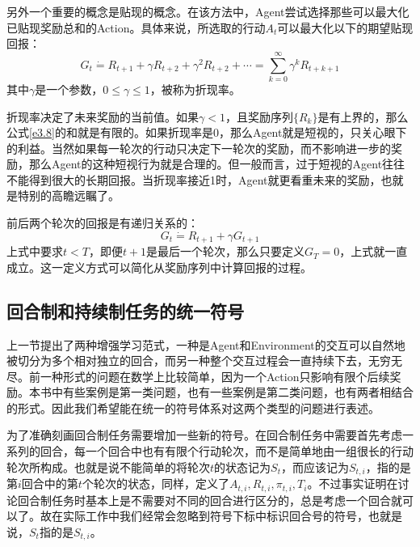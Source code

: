\documentclass{ctexart}
\begin{document}
            另外一个重要的概念是贴现的概念。在该方法中，Agent尝试选择那些可以最大化已贴现奖励总和的Action。具体来说，所选取的行动$A_t$可以最大化以下的期望贴现回报：
            \begin{equation}
                G_t \dot{=} R_{t+1} + \gamma R_{t+2} + \gamma^2 R_{t+2} + \cdots = \sum_{k=0}^{\infty} \gamma^k R_{t+k+1}
                \label{e3.8}
            \end{equation}
            其中$\gamma$是一个参数，$0\le \gamma \le 1$，被称为折现率。

            折现率决定了未来奖励的当前值。如果$\gamma<1$，且奖励序列$\{R_k\}$是有上界的，那么公式\ref{e3.8}的和就是有限的。如果折现率是0，那么Agent就是短视的，只关心眼下的利益。当然如果每一轮次的行动只决定下一轮次的奖励，而不影响进一步的奖励，那么Agent的这种短视行为就是合理的。但一般而言，过于短视的Agent往往不能得到很大的长期回报。当折现率接近1时，Agent就更看重未来的奖励，也就是特别的高瞻远瞩了。

            前后两个轮次的回报是有递归关系的：
            \begin{equation}
                G_t \dot{=} R_{t+1} + \gamma G_{t+1}
                \label{e3.9}
            \end{equation}
            上式中要求$t <T$，即便$t+1$是最后一个轮次，那么只要定义$G_T=0$，上式就一直成立。这一定义方式可以简化从奖励序列中计算回报的过程。

        \subsection{回合制和持续制任务的统一符号}
            上一节提出了两种增强学习范式，一种是Agent和Environment的交互可以自然地被切分为多个相对独立的回合，而另一种整个交互过程会一直持续下去，无穷无尽。前一种形式的问题在数学上比较简单，因为一个Action只影响有限个后续奖励。本书中有些案例是第一类问题，也有一些案例是第二类问题，也有两者相结合的形式。因此我们希望能在统一的符号体系对这两个类型的问题进行表述。

            为了准确刻画回合制任务需要增加一些新的符号。在回合制任务中需要首先考虑一系列的回合，每一个回合中也有有限个行动轮次，而不是简单地由一组很长的行动轮次所构成。也就是说不能简单的将轮次$t$的状态记为$S_t$，而应该记为$S_{t,i}$，指的是第$i$回合中的第$t$个轮次的状态，同样，定义了$A_{t,i},R_{t,i},\pi_{t,i},T_i$。不过事实证明在讨论回合制任务时基本上是不需要对不同的回合进行区分的，总是考虑一个回合就可以了。故在实际工作中我们经常会忽略到符号下标中标识回合号的符号，也就是说，$S_t$指的是$S_{t,i}$。
\end{document}
